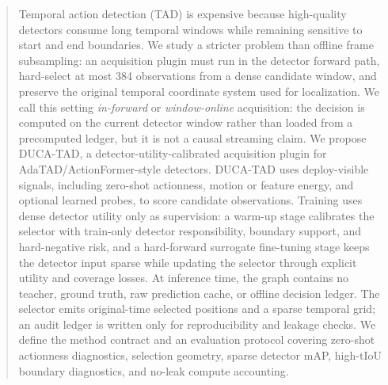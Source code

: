 \begin{abstract}
Temporal action detection (TAD) is expensive because high-quality detectors consume long temporal windows while remaining sensitive to start and end boundaries. We study a stricter problem than offline frame subsampling: an acquisition plugin must run in the detector forward path, hard-select at most 384 observations from a dense candidate window, and preserve the original temporal coordinate system used for localization. We call this setting \emph{in-forward} or \emph{window-online} acquisition: the decision is computed on the current detector window rather than loaded from a precomputed ledger, but it is not a causal streaming claim. We propose DUCA-TAD, a detector-utility-calibrated acquisition plugin for AdaTAD/ActionFormer-style detectors. DUCA-TAD uses deploy-visible signals, including zero-shot actionness, motion or feature energy, and optional learned probes, to score candidate observations. Training uses dense detector utility only as supervision: a warm-up stage calibrates the selector with train-only detector responsibility, boundary support, and hard-negative risk, and a hard-forward surrogate fine-tuning stage keeps the detector input sparse while updating the selector through explicit utility and coverage losses. At inference time, the graph contains no teacher, ground truth, raw prediction cache, or offline decision ledger. The selector emits original-time selected positions and a sparse temporal grid; an audit ledger is written only for reproducibility and leakage checks. We define the method contract and an evaluation protocol covering zero-shot actionness diagnostics, selection geometry, sparse detector mAP, high-tIoU boundary diagnostics, and no-leak compute accounting.
\end{abstract}
